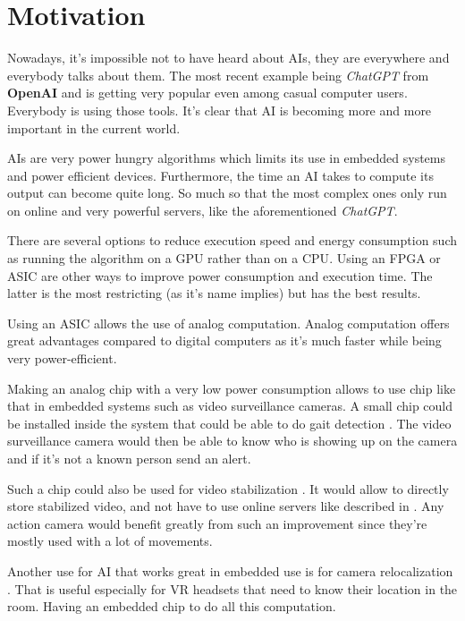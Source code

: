 \section{Motivation}
\label{sec:int_motivation}

Nowadays, it's impossible not to have heard about \acp{AI}, they are everywhere and everybody talks about them. The most recent example being \textit{ChatGPT} from \textbf{OpenAI} and is getting very popular even among casual computer users. Everybody is using those tools. It's clear that \ac{AI} is becoming more and more important in the current world.

\acp{AI} are very power hungry algorithms which limits its use in embedded systems and power efficient devices.
Furthermore, the time an \ac{AI} takes to compute its output can become quite long. So much so that the most complex ones only run on online and very powerful servers, like the aforementioned \textit{ChatGPT}.

There are several options to reduce execution speed and energy consumption such as running the algorithm on a \ac{GPU} rather than on a \ac{CPU}. Using an \ac{FPGA} or \ac{ASIC} are other ways to improve power consumption and execution time.
The latter is the most restricting (as it's name implies) but has the best results.

Using an \ac{ASIC} allows the use of analog computation. Analog computation offers great advantages compared to digital computers as it's much faster while being very power-efficient.

Making an analog chip with a very low power consumption allows to use chip like that in embedded systems such as video surveillance cameras. A small chip could be installed inside the system that could be able to do gait detection \cite{gaitDS,gaitDig,gait}. The video surveillance camera would then be able to know who is showing up on the camera and if it's not a known person send an alert.

Such a chip could also be used for video stabilization \cite{videoStab}. It would allow to directly store stabilized video, and not have to use online servers like described in \cite{videoStab}. Any action camera would benefit greatly from such an improvement since they're mostly used with a lot of movements.

Another use for \ac{AI} that works great in embedded use is for camera relocalization \cite{videoReloc}. That is useful especially for VR headsets that need to know their location in the room. Having an embedded chip to do all this computation.
